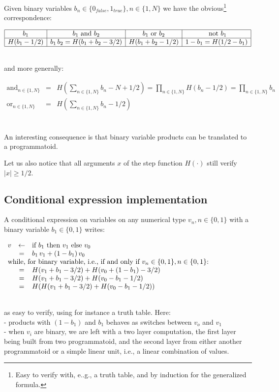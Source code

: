 \documentclass[a4]{article}
\newcommand{\eqline}[1]{~\vspace{0.1cm}\\\centerline{$#1$}\vspace{0.1cm}\\}
\begin{document}
Given binary variables $b_n \in \{0_{{false}}, 1_{{true}}\}, n \in \{1, N\}$ we have the obvious\footnote{Easy to verify with, e..g., a truth table, and by induction for the generalized formula.} correspondence:
\eqline{\begin{array}{|c|c|c|c|} \hline
    b_1               & b_1 \mbox{ and } b_2                &  b_1 \mbox{ or } b_2   & \mbox{ not } b_1 \\ \hline
    H(b_1 - 1/2) & b_1 \, b_2 = H(b_1 + b_ 2 - 3/2)  & H(b_1 + b_ 2 - 1/2)       & 1 - b_1  = H(1/2 - b_1) \\ \hline
\end{array}} and more generally:
\eqline{\begin{array}{rcl}
    \mbox{and}_{n \in \{1, N\}} &=& H\left(\sum_{n \in \{1, N\}} b_n - N + 1/2\right) = \prod_{n \in \{1,  N\}} H(b_n - 1/2) = \prod_{n \in \{1,  N\}} b_n \\
    \mbox{or}_{n \in \{1, N\}} &=& H\left(\sum_{n \in \{1, N\}} b_n - 1/2\right) \\
\end{array}}

An interesting consequence is that binary variable products can be translated to a programmatoid.

Let us also notice that all arguments $x$ of the step function $H(\cdot)$ still verify $|x| \ge 1/2$.

\subsection{Conditional expression implementation}

A conditional expression on variables on any numerical type $v_n, n \in \{0, 1\}$  with a binary variable $b_1 \in \{0, 1\}$ writes: \eqline{\begin{array}{rcl}
     v &\leftarrow& \mbox{if } b_1 \mbox{ then } v_1 \mbox{ else } v_0 \\
    &=& b_1 \, v_1 + (1 - b_1) \, v_0 \\
    \multicolumn{3}{l}{\mbox{while, for binary variable, i.e., if and only if $v_n \in \{0, 1\},  n \in \{0, 1\}$: }} \\
    &=& H(v_1 + b_1 - 3/2) + H(v_0 + (1 - b_1) - 3/2) \\
    &=& H(v_1 + b_1 - 3/2) + H(v_0 - b_1 - 1/2) \\
    &=& H(H(v_1 + b_1 - 3/2) + H(v_0 - b_1 - 1/2)) \\
\end{array}}
as easy to verify, using for instance a truth table. Here:
\\- products with $(1 - b_1)$ and $b_1$ behaves as switches between $v_o$ and $v_1$
\\ - when $v_i$ are binary, we are left with a two layer computation, the first layer being built from two programmatoid,
and the second layer from either another programmatoid or a simple linear unit, i.e., a linear combination of values.
        
\end{document}
